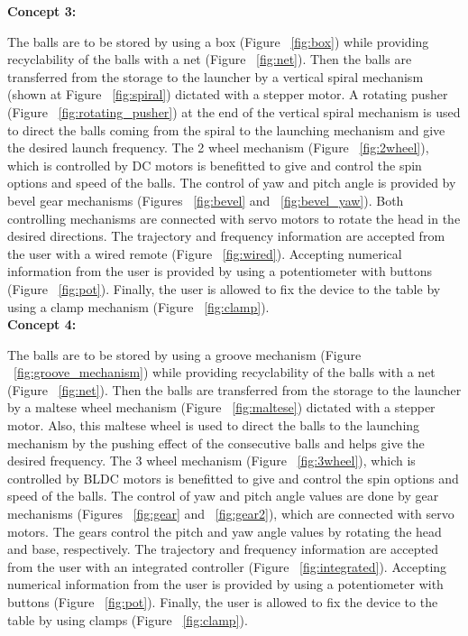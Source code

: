 \documentclass[12pt]{report}
\begin{document}
    \textbf{Concept 3:}

    The balls are to be stored by using a box (Figure ~\ref{fig:box}) while providing recyclability of the balls with a net (Figure ~\ref{fig:net}). Then the balls are transferred from the storage to the launcher by a vertical spiral mechanism (shown at Figure ~\ref{fig:spiral}) dictated with a stepper motor. A rotating pusher (Figure ~\ref{fig:rotating_pusher}) at the end of the vertical spiral mechanism is used to direct the balls coming from the spiral to the launching mechanism and give the desired launch frequency. The 2 wheel mechanism (Figure ~\ref{fig:2wheel}), which is controlled by DC motors is benefitted to give and control the spin options and speed of the balls. The control of yaw and pitch angle is provided by bevel gear mechanisms (Figures ~\ref{fig:bevel} and ~\ref{fig:bevel_yaw}). Both controlling mechanisms are connected with servo motors to rotate the head in the desired directions. The trajectory and frequency information are accepted from the user with a wired remote (Figure ~\ref{fig:wired}). Accepting numerical information from the user is provided by using a potentiometer with buttons (Figure ~\ref{fig:pot}). Finally, the user is allowed to fix the device to the table by using a clamp mechanism (Figure ~\ref{fig:clamp}). \\

    \textbf{Concept 4:}

    The balls are to be stored by using a groove mechanism (Figure ~\ref{fig:groove_mechanism}) while providing recyclability of the balls with a net (Figure ~\ref{fig:net}). Then the balls are transferred from the storage to the launcher by a maltese wheel mechanism (Figure ~\ref{fig:maltese}) dictated with a stepper motor. Also, this maltese wheel is used to direct the balls to the launching mechanism by the pushing effect of the consecutive balls and helps give the desired frequency. The 3 wheel mechanism (Figure ~\ref{fig:3wheel}), which is controlled by BLDC motors is benefitted to give and control the spin options and speed of the balls. The control of yaw and pitch angle values are done by gear mechanisms (Figures ~\ref{fig:gear} and ~\ref{fig:gear2}), which are connected with servo motors. The gears control the pitch and yaw angle values by rotating the head and base, respectively. The trajectory and frequency information are accepted from the user with an integrated controller (Figure ~\ref{fig:integrated}). Accepting numerical information from the user is provided by using a potentiometer with buttons (Figure ~\ref{fig:pot}). Finally, the user is allowed to fix the device to the table by using clamps (Figure ~\ref{fig:clamp}). \\
\end{document}
